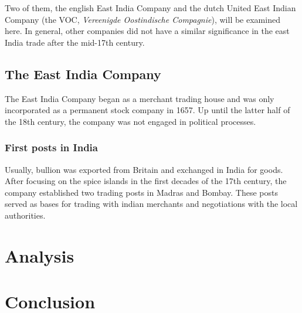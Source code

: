 \documentclass[11pt, a4paper, headings=standardclasses]{scrartcl}
\begin{document}
Two of them, the english East India Company and the dutch United East Indian Company (the VOC, \textit{Vereenigde Oostindische Compagnie}), will be examined here. In general, other companies did not have a similar significance in the east India trade after the mid-17th century.

\subsection{The East India Company}

The East India Company began as a merchant trading house and was only incorporated as a permanent stock company in 1657.\autocite{EIC2} Up until the latter half of the 18th century, the company was not engaged in political processes.

\subsubsection{First posts in India}

Usually, bullion was exported from Britain and exchanged in India for goods. After focusing on the spice islands in the first decades of the 17th century, the company established two trading posts in Madras and Bombay. These posts served as bases for trading with indian merchants and negotiations with the local authorities.

\section{Analysis}
\section{Conclusion}
\clearpage
\appendix
\printbibliography
\end{document}
